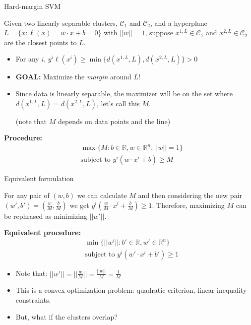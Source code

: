 \documentclass{beamer}
\begin{document}
\begin{frame}{Hard-margin SVM}

Given two linearly separable clusters, $\mathcal{C}_1$ and $\mathcal{C}_2$, and a hyperplane $L=\{x:\ell(x) = w\cdot x + b = 0\}$ with $||w||=1$, suppose $x^{1,L} \in \mathcal{C}_1$ and $x^{2,L} \in \mathcal{C}_2$ are the closest points to $L$.
\begin{itemize}
    \item For any $i$, $y^i\ell(x^i) \geq \min \{d(x^{1,L},L), d(x^{2,L},L)\}> 0 $
    \item \textbf{GOAL:} Maximize the \textit{margin} around $L$! %
    \item Since data is linearly separable, the maximizer will be on the set where $d(x^{1,L},L)=d(x^{2,L},L)$, let's call this $M$.

    (note that $M$ depends on data points and the line)
\end{itemize}
\vspace{0.5cm}
\pause
\textbf{Procedure:}
\begin{align}
& \max \{M:b\in\mathbb{R}, w \in\mathbb{R}^n, ||w||=1\} \\
& \text{subject to } y^i(w\cdot x^i + b)\geq M
\end{align}

\end{frame}


\begin{frame}{Equivalent formulation}

For any pair of $(w,b)$ we can calculate $M$ and then considering the new pair $(w',b')=(\frac{w}{M}, \frac{b}{M})$ we get $y^i(\frac{w}{M}\cdot x^i + \frac{b}{M})\geq 1$. Therefore, maximizing $M$ can be rephrased as minimizing $||w'||$.

\vspace{0.5cm}

\textbf{Equivalent procedure:}
\begin{align}
& \min \{||w'||:b'\in\mathbb{R}, w' \in\mathbb{R}^n\} \\
& \text{subject to } y^i(w'\cdot x^i + b')\geq 1
\end{align}
\begin{itemize}
    \item Note that: $||w'||=||\frac{w}{M}||=\frac{||w||}{M}=\frac{1}{M}$
    \item This is a convex optimization problem: quadratic criterion, linear inequality constraints.
    \item But, what if the clusters overlap?
\end{itemize}
\end{frame}
\end{document}
